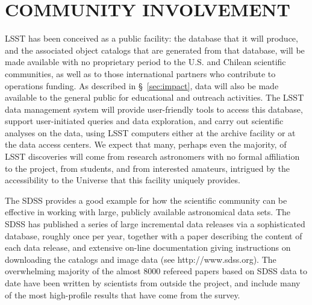 \section{  COMMUNITY INVOLVEMENT   }
\label{Sec:community}
 
LSST has been conceived as a public facility: the database that it will
produce, and the associated object catalogs that are generated from that
database, will be made available with no proprietary period to the
U.S. and Chilean scientific communities, as well as to those
international partners who contribute to operations funding.  As
described in \S~\ref{sec:impact}, data will also be made available to
the general public for educational and outreach activities.  
The LSST data management 
system will provide user-friendly tools to access this database, support
user-initiated queries and data exploration, and carry out scientific analyses on the
data, using LSST computers either at the archive facility 
or at the data access centers. 
We expect that many, perhaps even the majority,
of LSST discoveries will come from research astronomers with no formal
affiliation to the project, from students, and from interested amateurs, 
intrigued by the accessibility to the Universe that this facility uniquely 
provides. 

The SDSS provides a good example for how the scientific 
community can be effective in working with large, publicly available
astronomical data sets. The SDSS has published a series of large incremental
data releases via a sophisticated database, roughly once per year, together with 
a paper describing the content of each data release, and extensive on-line 
documentation giving instructions on downloading the catalogs and image data
(see http://www.sdss.org). The overwhelming majority of the almost
8000 refereed papers based 
on SDSS data to date have been written by scientists from outside 
the project, and  include many of the most high-profile results that have come 
from the survey. 

